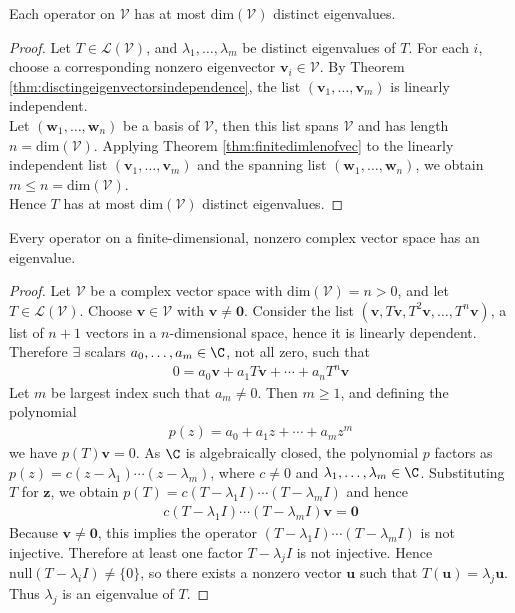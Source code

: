 \begin{corollary} Each operator on $\mathcal{V}$ has at most $\text{dim}(\mathcal{V})$ distinct eigenvalues.
\begin{proof} Let $T \in \mathcal{L}(\mathcal{V})$, and $\lambda_1, \ldots, \lambda_m$ be distinct eigenvalues of $T$. For each $i$, choose a corresponding nonzero eigenvector $\mathbf{v}_i \in \mathcal{V}$. By Theorem \ref{thm:disctingeigenvectorsindependence}, the list $(\mathbf{v}_1, \ldots, \mathbf{v}_m)$ is linearly independent.\\
Let $(\mathbf{w}_1, \ldots, \mathbf{w}_n)$ be a basis of $\mathcal{V}$, then this list spans $\mathcal{V}$ and has length $n = \text{dim}(\mathcal{V})$. Applying Theorem \ref{thm:finitedimlenofvec} to the linearly independent list $(\mathbf{v}_1, \ldots, \mathbf{v}_m)$ and the spanning list $(\mathbf{w}_1, \ldots, \mathbf{w}_n)$, we obtain $m \leq n = \text{dim}(\mathcal{V})$.\\
Hence $T$ has at most $\text{dim}(\mathcal{V})$ distinct eigenvalues.
\end{proof}
\end{corollary}

\begin{theorem} Every operator on a finite-dimensional, nonzero complex vector space has an eigenvalue.
\begin{proof} Let $\mathcal{V}$ be a complex vector space with $\text{dim}(\mathcal{V})=n>0$, and let $T \in \mathcal{L}(\mathcal{V})$. Choose $\mathbf{v} \in \mathcal{V}$ with $\mathbf{v} \neq \mathbf{0}$. Consider the list $(\mathbf{v}, T\mathbf{v}, T^2 \mathbf{v}, \ldots, T^n \mathbf{v})$, a list of $n+1$ vectors in a $n$-dimensional space, hence it is linearly dependent. Therefore $\exists$ scalars $a_0, \ldots, a_m \in \C$, not all zero, such that 
\begin{align}
0 = a_0 \mathbf{v} + a_1 T \mathbf{v} + \cdots + a_n T^n \mathbf{v} \nonumber
\end{align}
Let $m$ be largest index such that $a_m \neq 0$. Then $m \geq 1$, and defining the polynomial
\begin{align}
p(z) = a_0 + a_1 z + \cdots + a_m z^m \nonumber
\end{align}
we have $p(T) \mathbf{v} = 0$. As $\C$ is algebraically closed, the polynomial $p$ factors as $p(z) = c(z - \lambda_1) \cdots (z - \lambda_m)$, where $c \neq 0$ and $\lambda_1, \ldots, \lambda_m \in \C$. Substituting $T$ for $\mathbf{z}$, we obtain $p(T) = c(T - \lambda_1 I) \cdots (T - \lambda_m I)$ and hence
\begin{align}
c(T - \lambda_1 I) \cdots (T - \lambda_m I) \mathbf{v} = \mathbf{0} \nonumber
\end{align}
Because $\mathbf{v} \neq \mathbf{0}$, this implies the operator $(T - \lambda_1 I) \cdots (T - \lambda_m I)$ is not injective. Therefore at least one factor $T - \lambda_j I$ is not injective. Hence $\text{null}(T - \lambda_i I) \neq \{ 0 \}$, so there exists a nonzero vector $\mathbf{u}$ such that $T (\mathbf{u}) = \lambda_j \mathbf{u}$.\\
Thus $\lambda_j$ is an eigenvalue of $T$.
\end{proof}
\end{theorem}

